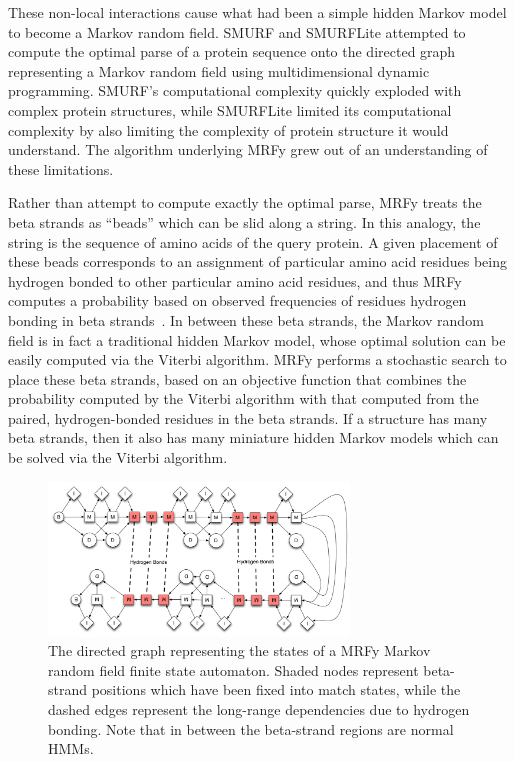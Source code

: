 \documentclass[preprint,nocopyrightspace,times]{sigplanconf}
\begin{document}
These non-local interactions cause what had been a simple hidden Markov model 
to become a Markov random field. SMURF and SMURFLite attempted to compute the 
optimal parse of a protein sequence onto the directed graph representing a 
Markov random field using multidimensional dynamic programming. SMURF's 
computational complexity quickly exploded with complex protein structures, 
while SMURFLite limited its computational complexity by also limiting the 
complexity of protein structure it would understand. The algorithm underlying 
MRFy grew out of an understanding of these limitations.


Rather than attempt to compute exactly the optimal parse, MRFy treats the beta 
strands as ``beads'' which can be slid along a string. In this analogy, the 
string is the sequence of amino acids of the query protein. A given placement 
of these beads corresponds to an assignment of particular amino acid residues 
being hydrogen bonded to other particular amino acid residues, and thus MRFy 
computes a probability based on observed frequencies of residues hydrogen 
bonding in beta strands~\cite{betawrappro}. In between these beta strands, the 
Markov random field is in fact a traditional hidden Markov model, whose optimal 
solution can be easily computed via the Viterbi algorithm. MRFy performs a 
stochastic search to place these beta strands, based on an objective function 
that combines the probability computed by the Viterbi algorithm with that 
computed from the paired, hydrogen-bonded residues in the beta strands. If a 
structure has many beta strands, then it also has many miniature hidden Markov 
models which can be solved via the Viterbi algorithm.


\begin{figure}[h!] 
\centerline{\includegraphics[width=8cm]{mrf_interleave_diagram.pdf}} 
\caption{The directed graph representing the states of a MRFy Markov random 
field finite state automaton. Shaded nodes represent beta-strand positions which have been fixed into match states, 
while the dashed edges represent the long-range dependencies due to hydrogen 
bonding. Note that in between the beta-strand regions are normal HMMs.}\label{mrf} \end{figure}
\end{document}
